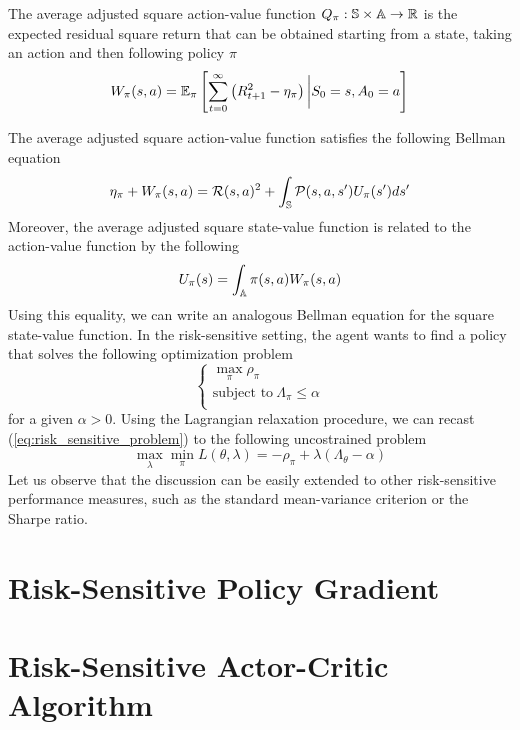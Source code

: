 \documentclass[a4paper,11pt]{article}
\begin{document}
\begin{definition}
	The average adjusted square action-value function $Q_\pi : \S \times \A \to 
	\R$ is the expected residual square return that can be obtained starting from a
	state, taking an action and then following policy $\pi$
	\begin{equation}
		W_\pi(s, a) = \E[\pi]{\sum^{\infty}_{t=0} \left(R_{t+1}^2 -
			\eta_\pi\right) \bigg| S_0 = s, A_0 = a}
	\end{equation}
\end{definition}
The average adjusted square action-value function satisfies the following 
Bellman equation
\begin{equation}
	\eta_\pi + W_\pi(s,a) = \calR(s,a)^2 + \int_\S \calP(s,a,s') U_\pi(s') ds'\\
\end{equation}
Moreover, the average adjusted square state-value function is related to the
action-value function by the following
\begin{equation}
	U_\pi(s) = \int_\A \pi(s,a) W_\pi(s,a)
\end{equation}
Using this equality, we can write an analogous Bellman equation for the
square state-value function. 
In the risk-sensitive setting, the agent wants to find a policy that solves the
following optimization problem 
\begin{equation}\label{eq:risk_sensitive_problem}
	\begin{cases}
		\max_\pi \rho_\pi\\
		\text{subject to}\ \Lambda_\pi \leq \alpha\\
	\end{cases}
\end{equation}
for a given $\alpha > 0$. Using the Lagrangian relaxation procedure, we can 
recast (\ref{eq:risk_sensitive_problem}) to the following uncostrained problem
\begin{equation}
	\max_\lambda \min_\pi L(\theta, \lambda) = - \rho_\pi + \lambda 
	(\Lambda_\theta - \alpha)
\end{equation}
Let us observe that the discussion can be easily extended to other
risk-sensitive performance measures, such as the standard mean-variance
criterion or the Sharpe ratio. 

\section{Risk-Sensitive Policy Gradient}

\section{Risk-Sensitive Actor-Critic Algorithm}



\end{document}
